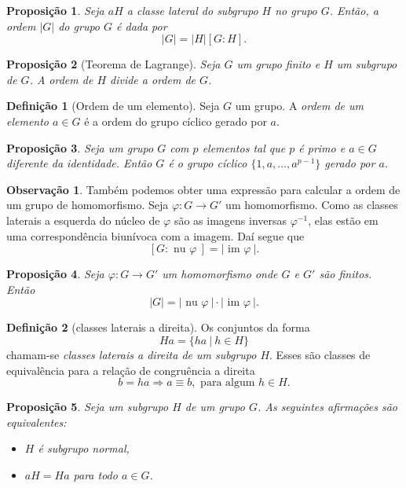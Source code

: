 \documentclass[a4paper,12pt]{report}
\theoremstyle{plain}
\newtheorem{proposicao}{Proposição}[section]
\theoremstyle{definition}
\newtheorem{definicao}{Definição}[section]
\newtheorem{observacao}{Observação}[section]
\begin{document}
\begin{proposicao}
	Seja \(aH\) a classe lateral do subgrupo \(H\) no grupo
	\(G\). Então, a ordem \(|G|\) do grupo \(G\) é dada por
	\[|G| = |H|[G:H].\]	
\end{proposicao}

\begin{proposicao}[Teorema de Lagrange]
	Seja \(G\) um grupo finito e
	\(H\) um subgrupo de \(G\). A ordem de \(H\) divide a ordem de \(G\).
\end{proposicao}

\begin{definicao}[Ordem de um elemento]
	Seja \(G\) um grupo. A \emph{ordem de um elemento \(a\in G\)} é a ordem do grupo cíclico gerado por \(a\).	
\end{definicao}

\begin{proposicao}
	Seja um grupo \(G\) com \(p\) elementos tal que
	\(p\) é primo e \(a\in G\) diferente da identidade. Então \(G\) é o
	grupo cíclico \(\{1,a,\dots,a^{p-1}\}\) gerado por \(a\).
\end{proposicao}

\begin{observacao}
	Também podemos obter uma expressão para calcular a ordem de um grupo de
	homomorfismo. Seja \(\varphi: G\longrightarrow G'\) um homomorfismo.
	Como as classes laterais a esquerda do núcleo de \(\varphi\) são as imagens
	inversas \(\varphi^{-1}\), elas estão em uma correspondência biunívoca
	com a imagem. Daí segue que
	\[[G:\text{ nu }\varphi\ ] = |\text{ im }\varphi\ |.\]
\end{observacao}

\begin{proposicao}
	Seja \(\varphi: G\longrightarrow G'\) um
	homomorfismo onde \(G\) e \(G'\) são finitos. Então
	\[|G| = |\text{ nu }\varphi\ |\cdot|\text{ im }\varphi\ |.\]	
\end{proposicao}

\begin{definicao}[classes laterais a direita]
	Os conjuntos da forma
	\[Ha = \{ha \ | \ h \in H\}\] chamam-se \emph{classes laterais a direita de um
		subgrupo \(H\)}. Esses são classes de equivalência para a relação de
	congruência a direita
	\[b = ha \Rightarrow a \equiv b, \text{ para algum }h \in H.\]	
\end{definicao}

\begin{proposicao}
	Seja um subgrupo \(H\) de um grupo \(G\). As
	seguintes afirmações são equivalentes:
	
	\begin{itemize}
		\item
		\(H\) é subgrupo normal,
		\item
		\(aH = Ha\) para todo \(a\in G\).
	\end{itemize}	
\end{proposicao}
\end{document}
